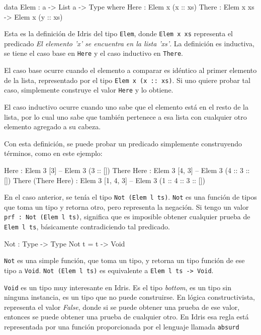 \begin{code}
data Elem : a -> List a -> Type where
     Here : Elem x (x :: xs)
     There : Elem x xs -> Elem x (y :: xs)
\end{code}

Esta es la definición de Idris del tipo \texttt{Elem}, donde \texttt{Elem x xs} representa el predicado \textit{El elemento 'x' se encuentra en la lista 'xs'}. La definición es inductiva, se tiene el caso base en \texttt{Here} y el caso inductivo en \texttt{There}.

El caso base ocurre cuando el elemento a comparar es idéntico al primer elemento de la lista, representado por el tipo \texttt{Elem x (x :: xs)}. Si uno quiere probar tal caso, simplemente construye el valor \texttt{Here} y lo obtiene.

El caso inductivo ocurre cuando uno sabe que el elemento está en el resto de la lista, por lo cual uno sabe que también pertenece a esa lista con cualquier otro elemento agregado a su cabeza.

Con esta definición, se puede probar un predicado simplemente construyendo términos, como en este ejemplo:

\begin{code}
Here : Elem 3 [3] -- Elem 3 (3 :: [])
There Here : Elem 3 [4, 3] -- Elem 3 (4 :: 3 :: [])
There (There Here) : Elem 3 [1, 4, 3] 
  -- Elem 3 (1 :: 4 :: 3 :: [])
\end{code}

En el caso anterior, se tenía el tipo \texttt{Not (Elem l ts)}. \texttt{Not} es una función de tipos que toma un tipo y retorna otro, pero representa la negación. Si tengo un valor \texttt{prf : Not (Elem l ts)}, significa que es imposible obtener cualquier prueba de \texttt{Elem l ts}, básicamente contradiciendo tal predicado. 

\begin{code}
Not : Type -> Type
Not t = t -> Void
\end{code}

\texttt{Not} es una simple función, que toma un tipo, y retorna un tipo función de ese tipo a \texttt{Void}. \texttt{Not (Elem l ts)} es equivalente a \texttt{Elem l ts -> Void}.

\texttt{Void} es un tipo muy interesante en Idris. Es el tipo \textit{bottom}, es un tipo sin ninguna instancia, es un tipo que no puede construirse. En lógica constructivista, representa el valor \textit{False}, donde si se puede obtener una prueba de ese valor, entonces se puede obtener una prueba de cualquier otro. En Idris esa regla está representada por una función proporcionada por el lenguaje llamada \texttt{absurd}

